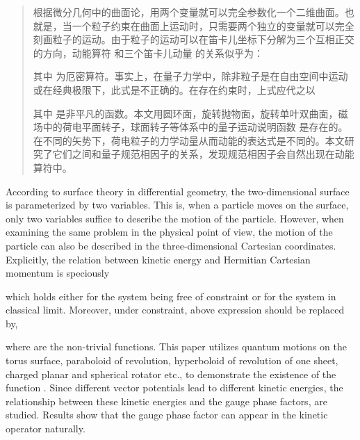 \documentclass{HNUThesis}
\begin{document}
\makeconsent

\newpage
\tableofcontents

\newpage

\begin{abstract}
    根据微分几何中的曲面论，用两个变量就可以完全参数化一个二维曲面。也就是，当一个粒子约束在曲面上运动时，只需要两个独立的变量就可以完全刻画粒子的运动。由于粒子的运动可以在笛卡儿坐标下分解为三个互相正交的方向，动能算符 和三个笛卡儿动量 的关系似乎为：
                 
其中 为厄密算符。事实上，在量子力学中，除非粒子是在自由空间中运动或在经典极限下，此式是不正确的。在存在约束时，上式应代之以
                
其中 是非平凡的函数。本文用圆环面，旋转抛物面，旋转单叶双曲面，磁场中的荷电平面转子，球面转子等体系中的量子运动说明函数 是存在的。
在不同的矢势下，荷电粒子的力学动量从而动能的表达式是不同的。本文研究了它们之间和量子规范相因子的关系，发现规范相因子会自然出现在动能算符中。

\end{abstract}



\begin{Abstract}
    According to surface theory in differential geometry, the two-dimensional surface is parameterized by two variables. This is, when a particle moves on the surface, only two variables suffice to describe the motion of the particle. However, when examining the same problem in the physical point of view, the motion of the particle can also be described in the three-dimensional Cartesian coordinates. Explicitly, the relation between kinetic energy  and Hermitian Cartesian momentum  is speciously 
 
which holds either for the system being free of constraint or for the system in classical limit. Moreover, under constraint, above expression should be replaced by,
                 
where  are the non-trivial functions. This paper utilizes quantum motions on the torus surface, paraboloid of revolution, hyperboloid of revolution of one sheet, charged planar and spherical rotator etc., to demonstrate the existence of the function .
Since different vector potentials lead to different kinetic energies, the relationship between these kinetic energies and the gauge phase factors, are studied. Results show that the gauge phase factor can appear in the kinetic operator naturally. 
\end{Abstract}
\end{document}
